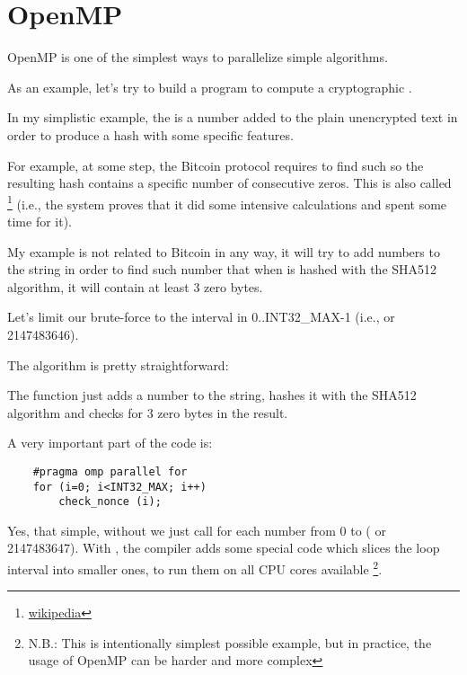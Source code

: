 \section{OpenMP}
\label{openmp}

OpenMP is one of the simplest ways to parallelize simple algorithms.


As an example, let's try to build a program to compute a cryptographic .

In my simplistic example, 
the  is a number added to the plain unencrypted text in order to produce a hash with some specific 
features.

For example, at some step, the Bitcoin protocol requires to find such  so the resulting hash
contains a specific number of consecutive zeros.
This is also called 
\footnote{\href{http://go.yurichev.com/17101}{wikipedia}} 
(i.e., the system proves that it did some intensive calculations and spent some time for it).

My example is not related to Bitcoin in any way, 
it will try to add numbers to the 
string in order to find such number that when 
 is hashed with the SHA512 algorithm, it will contain at least 3 zero bytes.

Let's limit our brute-force to the interval in
0..INT32\_MAX-1 (i.e.,  or 2147483646).

The algorithm is pretty straightforward:



The  function just adds a number to the string, 
hashes it with the SHA512 algorithm and checks for 3 zero bytes in the result.

A very important part of the code is:

\begin{lstlisting}
	#pragma omp parallel for
	for (i=0; i<INT32_MAX; i++)
		check_nonce (i);
\end{lstlisting}

Yes, that simple, without  
we just call  for each number from 0 to 
 ( or 2147483647).
With , the compiler adds some special 
code which slices the loop interval into smaller ones,
to run them on all \ac{CPU} cores available
\footnote{N.B.: This is intentionally simplest possible
example, but in practice, the usage of OpenMP can be harder and more complex}.

